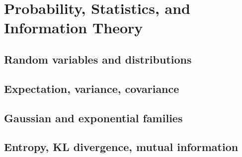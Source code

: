 ﻿\chapter{Probability, Statistics, and Information Theory}
\section{Random variables and distributions}

\section{Expectation, variance, covariance}

\section{Gaussian and exponential families}

\section{Entropy, KL divergence, mutual information}


